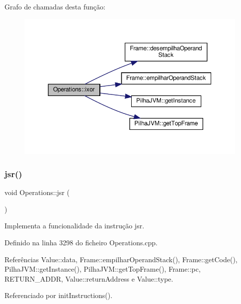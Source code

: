 Grafo de chamadas desta função\+:
\nopagebreak
\begin{figure}[H]
\begin{center}
\leavevmode
\includegraphics[width=350pt]{classOperations_abd0ce3453623b677de3af1f05bcf4b0b_cgraph}
\end{center}
\end{figure}
\mbox{\label{classOperations_a63c3ab8fef60a8a19ee336cb3d86f9aa}} 
\subsubsection{\texorpdfstring{jsr()}{jsr()}}
{\footnotesize\ttfamily void Operations\+::jsr (\begin{DoxyParamCaption}{ }\end{DoxyParamCaption})\hspace{0.3cm}{\ttfamily [private]}}



Implementa a funcionalidade da instrução jsr. 



Definido na linha 3298 do ficheiro Operations.\+cpp.



Referências Value\+::data, Frame\+::empilhar\+Operand\+Stack(), Frame\+::get\+Code(), Pilha\+J\+V\+M\+::get\+Instance(), Pilha\+J\+V\+M\+::get\+Top\+Frame(), Frame\+::pc, R\+E\+T\+U\+R\+N\+\_\+\+A\+D\+DR, Value\+::return\+Address e Value\+::type.



Referenciado por init\+Instructions().

